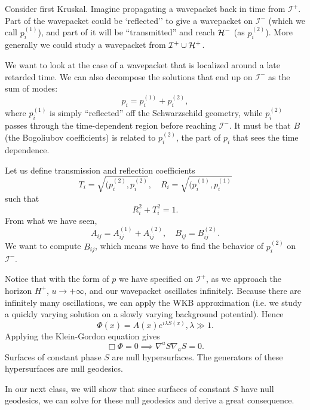 Consider first Kruskal. Imagine propagating a wavepacket back in time from $\mathcal{I}^+$. Part of the wavepacket could be `reflected'' to give a wavepacket on $\mathcal{I}^-$ (which we call $p_i^{(1)}$), and part of it will be ``transmitted'' and reach $\mathcal H^-$ (as $p_i^{(2)}$). More generally we could study a wavepacket from $\mathcal{I}^+\cup \mathcal H^+$.

We want to look at the case of a wavepacket that is localized around a late retarded time. We can also decompose the solutions that end up on $\mathcal{I}^-$ as the sum of modes:
\begin{equation}
    p_i=p_i^{(1)} +p_i^{(2)},
\end{equation}
where $p_i^{(1)}$ is simply ``reflected'' off the Schwarzschild geometry, while $p_i^{(2)}$ passes through the time-dependent region before reaching $\mathcal{I}^-$. It must be that $B$ (the Bogoliubov coefficients) is related to $p_i^{(2)}$, the part of $p_i$ that sees the time dependence.

Let us define transmission and reflection coefficients
\begin{equation}
    T_i =\sqrt{(p_i^{(2)},p_i^{(2)}},\quad R_i =\sqrt{(p_i^{(1)},p_i^{(1)}}
\end{equation}
such that
\begin{equation}
    R_i^2+T_i^2=1.
\end{equation}
From what we have seen,
\begin{equation}
    A_{ij}=A_{ij}^{(1)}+A_{ij}^{(2)},\quad B_{ij} = B_{ij}^{(2)}.
\end{equation}
We want to compute $B_{ij}$, which means we have to find the behavior of $p_i^{(2)}$ on $\mathcal{I}^-$.

Notice that with the form of $p$ we have specified on $\mathcal{I}^+$, as we approach the horizon $H^+$, $u\to +\infty$, and our wavepacket oscillates infinitely. Because there are infinitely many oscillations, we can apply the WKB approximation (i.e. we study a quickly varying solution on a slowly varying background potential). Hence
\begin{equation}
    \Phi(x) = A(x) e^{i\lambda S(x)},\lambda \gg 1.
\end{equation}
Applying the Klein-Gordon equation gives
\begin{equation}
    \Box \Phi = 0 \implies \nabla^a S \nabla_a S =0.
\end{equation}
Surfaces of constant phase $S$ are null hypersurfaces. The generators of these hypersurfaces are null geodesics.

In our next class, we will show that since surfaces of constant $S$ have null geodesics, we can solve for these null geodesics and derive a great consequence.